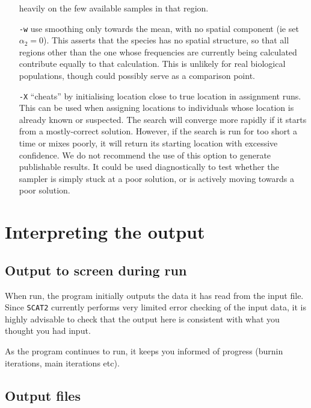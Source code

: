 \documentclass[10pt,titlepage,times,letterpaper]{article}
\def\SCAT{{\tt SCAT2} }
\begin{document}
\begin{itemize}
heavily on the few available samples in that region.
\item[{\tt -w}] use smoothing only towards the mean, with no spatial component (ie set
$\alpha_2 = 0$).  This asserts that the species has no spatial 
structure, so that all regions other than the one whose frequencies are
currently being calculated contribute equally to that calculation.  This is
unlikely for real biological populations, though could possibly serve as
a comparison point.
\item[{\tt -X}] ``cheats'' by initialising location close to true location in assignment runs.  
This can be used when assigning locations to 
individuals whose location is already known or suspected.  The search will
converge more rapidly if it starts from a mostly-correct solution.
However, if the search is run for too short a time or mixes poorly, it will
return its starting location with excessive confidence.  We do not recommend
the use of this option to generate publishable results.
It could be used diagnostically to
test whether the sampler is simply stuck at a poor solution, or is actively
moving towards a poor solution.
\end{itemize}



\section{Interpreting the output} \label{interpret}

\subsection{Output to screen during run}

When run, the program initially outputs the data it has read from the
input file. Since \SCAT currently performs very limited error
checking of the input data,
it is highly advisable to check that
the output here is consistent with what you thought you had input.

As the program continues to run, it keeps you informed of progress
(burnin iterations, main iterations etc). 

\subsection{Output files} \label{out}
\end{document}
